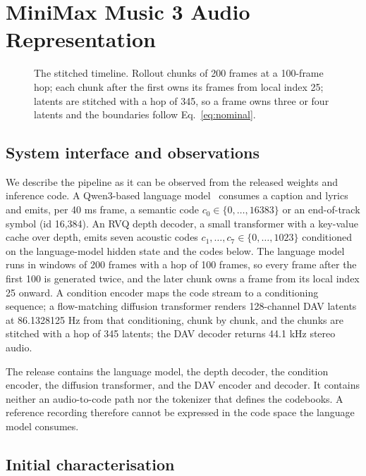 \section{MiniMax Music 3 Audio Representation}
\label{sec:representation}

\begin{figure}[t]
  \centering
  \resizebox{0.95\textwidth}{!}{}
  \caption{The stitched timeline. Rollout chunks of 200 frames at a 100-frame hop; each chunk after the first owns its frames from local index 25; latents are stitched with a hop of 345, so a frame owns three or four latents and the boundaries follow Eq.~\ref{eq:nominal}.}
  \label{fig:timeline}
\end{figure}

\subsection{System interface and observations}

We describe the pipeline as it can be observed from the released weights and inference code. A Qwen3-based language model~\cite{qwen3} consumes a caption and lyrics and emits, per 40 ms frame, a semantic code $c_0 \in \{0,\dots,16383\}$ or an end-of-track symbol (id 16,384). An RVQ depth decoder, a small transformer with a key-value cache over depth, emits seven acoustic codes $c_1,\dots,c_7 \in \{0,\dots,1023\}$ conditioned on the language-model hidden state and the codes below. The language model runs in windows of 200 frames with a hop of 100 frames, so every frame after the first 100 is generated twice, and the later chunk owns a frame from its local index 25 onward. A condition encoder maps the code stream to a conditioning sequence; a flow-matching diffusion transformer renders 128-channel DAV latents at 86.1328125 Hz from that conditioning, chunk by chunk, and the chunks are stitched with a hop of 345 latents; the DAV decoder returns 44.1 kHz stereo audio.

The release contains the language model, the depth decoder, the condition encoder, the diffusion transformer, and the DAV encoder and decoder. It contains neither an audio-to-code path nor the tokenizer that defines the codebooks. A reference recording therefore cannot be expressed in the code space the language model consumes.

\subsection{Initial characterisation}

